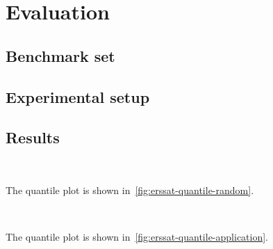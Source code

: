 \section{Evaluation}
\label{sect:erssat-evaluation}

\subsection{Benchmark set}

\subsection{Experimental setup}

\subsection{Results}

\begin{figure*}[ht]
    \centering
    \\
    \caption{Quantile plots of random $k$-CNF formulas}
    \label{fig:erssat-quantile-random}
\end{figure*}

The quantile plot is shown in~\cref{fig:erssat-quantile-random}.

\begin{figure*}[ht]
    \centering
    \\
    \caption{Quantile plots of application formulas}
    \label{fig:erssat-quantile-application}
\end{figure*}

The quantile plot is shown in~\cref{fig:erssat-quantile-application}.